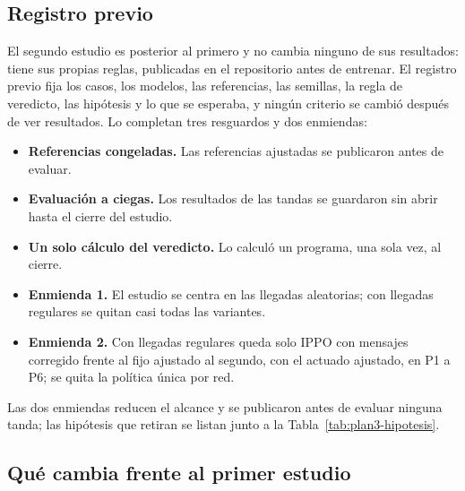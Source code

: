 \subsection*{Registro previo}

El segundo estudio es posterior al primero y no cambia ninguno de sus
resultados: tiene sus propias reglas, publicadas en el repositorio
antes de entrenar. El registro previo fija los casos, los modelos, las
referencias, las semillas, la regla de veredicto, las hipótesis y lo
que se esperaba, y ningún criterio se cambió después de ver
resultados. Lo completan tres resguardos y dos enmiendas:
\begin{itemize}
  \item \textbf{Referencias congeladas.} Las referencias ajustadas se
    publicaron antes de evaluar.
  \item \textbf{Evaluación a ciegas.} Los resultados de las tandas se
    guardaron sin abrir hasta el cierre del estudio.
  \item \textbf{Un solo cálculo del veredicto.} Lo calculó un programa,
    una sola vez, al cierre.
  \item \textbf{Enmienda 1.} El estudio se centra en las llegadas
    aleatorias; con llegadas regulares se quitan casi todas las
    variantes.
  \item \textbf{Enmienda 2.} Con llegadas regulares queda solo IPPO con
    mensajes corregido frente al fijo ajustado al segundo, con el
    actuado ajustado, en P1 a P6; se quita la política única por red.
\end{itemize}
Las dos enmiendas reducen el alcance y se publicaron antes de evaluar
ninguna tanda; las hipótesis que retiran se listan junto a la
Tabla~\ref{tab:plan3-hipotesis}.

\subsection*{Qué cambia frente al primer estudio}

